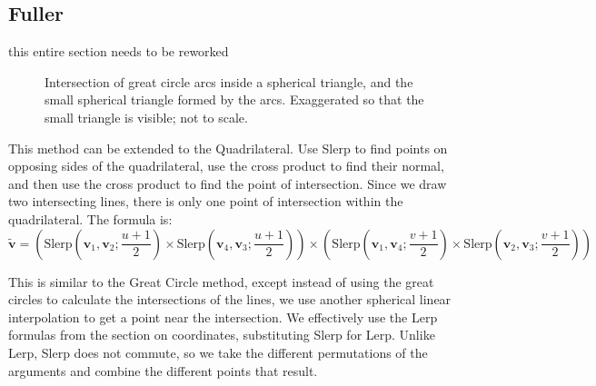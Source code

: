 \documentclass{amsart}[12pt]
\begin{document}
\subsection{Fuller}
this entire section needs to be reworked\cite{crider09}
\begin{figure}%
\caption{Intersection of great circle arcs inside a spherical triangle,
and the small spherical triangle formed by the arcs. Exaggerated so that the
small triangle is visible; not to scale.}
\label{fig:intlines}
\end{figure}

This method can be extended to the Quadrilateral. Use Slerp to find points on
opposing sides of the quadrilateral, use the cross product to find their
normal, and then use the cross product to find the point of intersection. Since
we draw two intersecting lines, there is only one point of intersection within
the quadrilateral. The formula is:
\begin{equation}\label{eq:gcq}%
\widetilde{\mathbf v} =
(\mathrm{Slerp}(\mathbf v_1, \mathbf v_2; \frac{u+1}{2})
\times
\mathrm{Slerp}(\mathbf v_4, \mathbf v_3; \frac{u+1}{2}))
\times
(\mathrm{Slerp}(\mathbf v_1, \mathbf v_4; \frac{v+1}{2})
\times
\mathrm{Slerp}(\mathbf v_2, \mathbf v_3; \frac{v+1}{2}))
\end{equation}

This is similar to the Great Circle method, except instead of using the great
circles to calculate the intersections of the lines, we use another spherical
linear interpolation to get a point near the intersection. We effectively use
the Lerp formulas from the section on coordinates, substituting Slerp for Lerp.
Unlike Lerp, Slerp does not commute, so we take the different permutations of
the arguments and combine the different points that result.
\end{document}
